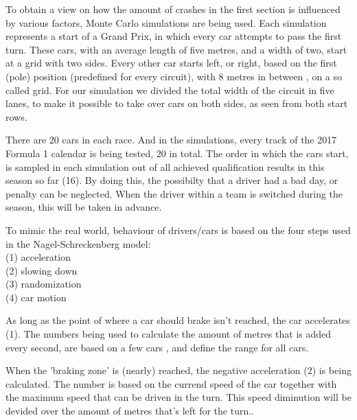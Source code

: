 To obtain a view on how the amount of crashes in the first section is influenced by various factors, Monte Carlo simulations are being used. Each simulation represents a start of a Grand Prix, in which every car attempts to pass the first turn. These cars, with an average length of five metres, and a width of two, start at a grid with two sides. Every other car starts left, or right, based on the first (pole) position (predefined for every circuit), with 8 metres in between \cite{car-regulations}, on a so called grid. For our simulation we divided the total width of the circuit in five lanes, to make it possible to take over cars on both sides, as seen from both start rows.

There are 20 cars in each race. And in the simulations, every track of the 2017 Formula 1 calendar is being tested, 20 in total. The order in which the cars start, is sampled in each simulation out of all achieved qualification results in this season so far (16). By doing this, the possibilty that a driver had a bad day, or penalty can be neglected. When the driver within a team is switched during the season, this will be taken in advance.

To mimic the real world, behaviour of drivers/cars is based on the four steps used in the Nagel-Schreckenberg model:\\

\noindent
(1) acceleration\\
(2) slowing down\\
(3) randomization\\
(4) car motion

\smallskip
As long as the point of where a car should brake isn't reached, the car accelerates (1). The numbers being used to calculate the amount of metres that is added every second, are based on a few cars \cite{som}, and define the range for all cars.

When the 'braking zone' is (nearly) reached, the negative acceleration (2) is being calculated. The number is based on the currend speed of the car together with the maximum speed that can be driven in the turn. This speed diminution will be devided over the amount of metres that's left for the turn.\cite{som}.

